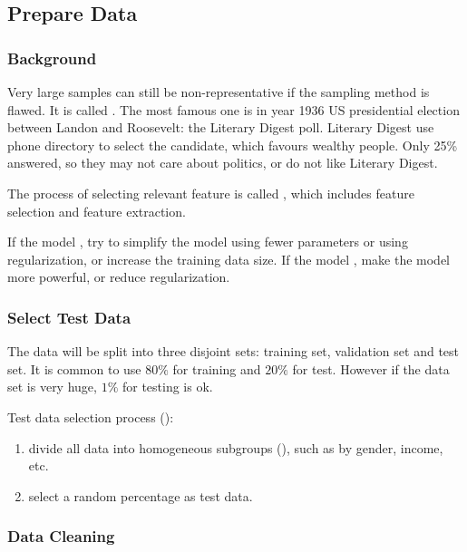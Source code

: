 \subsection{Prepare Data}

\subsubsection{Background}

Very large samples can still be non-representative if the sampling method is flawed. It is called . The most famous one is in year 1936 US presidential election between Landon and Roosevelt: the Literary Digest poll. Literary Digest use phone directory to select the candidate, which favours wealthy people. Only 25\% answered, so they may not care about politics, or do not like Literary Digest.

The process of selecting relevant feature is called , which includes feature selection and feature extraction.


If the model , try to simplify the model using fewer parameters or using regularization, or increase the training data size. If the model , make the model more powerful, or reduce regularization.




\subsubsection{Select Test Data}

The data will be split into three disjoint sets: training set, validation set and test set. It is common to use $80\%$ for training and $20\%$ for test. However if the data set is very huge, $1\%$ for testing is ok. 

Test data selection process ():
\begin{enumerate}
    \item divide all data into homogeneous subgroups (), such as by gender, income, etc.
    \item select a random percentage as test data.
\end{enumerate}




\subsubsection{Data Cleaning}

